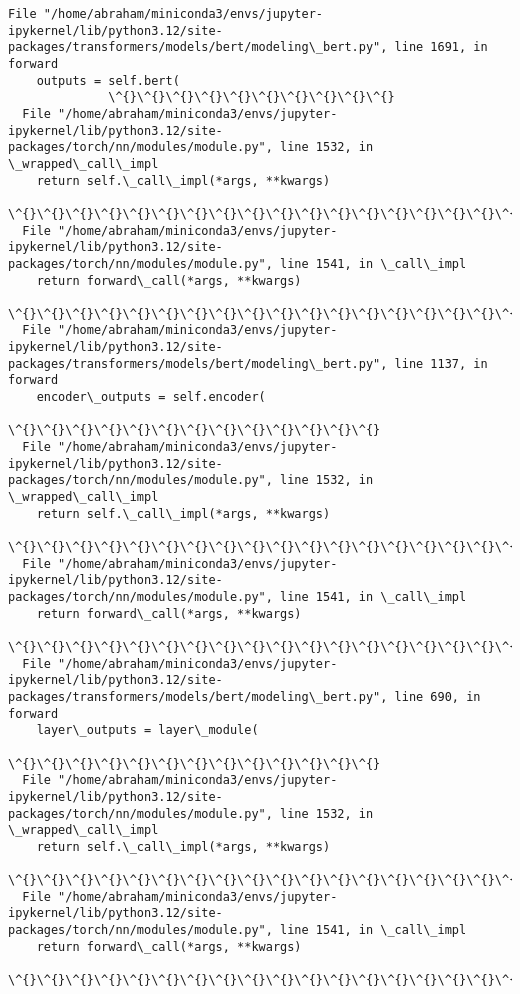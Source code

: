 \documentclass[11pt]{article}
\begin{document}
\begin{Verbatim}[commandchars=\\\{\}]
  File "/home/abraham/miniconda3/envs/jupyter-ipykernel/lib/python3.12/site-
packages/transformers/models/bert/modeling\_bert.py", line 1691, in forward
    outputs = self.bert(
              \^{}\^{}\^{}\^{}\^{}\^{}\^{}\^{}\^{}\^{}
  File "/home/abraham/miniconda3/envs/jupyter-ipykernel/lib/python3.12/site-
packages/torch/nn/modules/module.py", line 1532, in \_wrapped\_call\_impl
    return self.\_call\_impl(*args, **kwargs)
           \^{}\^{}\^{}\^{}\^{}\^{}\^{}\^{}\^{}\^{}\^{}\^{}\^{}\^{}\^{}\^{}\^{}\^{}\^{}\^{}\^{}\^{}\^{}\^{}\^{}\^{}\^{}\^{}\^{}\^{}\^{}\^{}
  File "/home/abraham/miniconda3/envs/jupyter-ipykernel/lib/python3.12/site-
packages/torch/nn/modules/module.py", line 1541, in \_call\_impl
    return forward\_call(*args, **kwargs)
           \^{}\^{}\^{}\^{}\^{}\^{}\^{}\^{}\^{}\^{}\^{}\^{}\^{}\^{}\^{}\^{}\^{}\^{}\^{}\^{}\^{}\^{}\^{}\^{}\^{}\^{}\^{}\^{}\^{}
  File "/home/abraham/miniconda3/envs/jupyter-ipykernel/lib/python3.12/site-
packages/transformers/models/bert/modeling\_bert.py", line 1137, in forward
    encoder\_outputs = self.encoder(
                      \^{}\^{}\^{}\^{}\^{}\^{}\^{}\^{}\^{}\^{}\^{}\^{}\^{}
  File "/home/abraham/miniconda3/envs/jupyter-ipykernel/lib/python3.12/site-
packages/torch/nn/modules/module.py", line 1532, in \_wrapped\_call\_impl
    return self.\_call\_impl(*args, **kwargs)
           \^{}\^{}\^{}\^{}\^{}\^{}\^{}\^{}\^{}\^{}\^{}\^{}\^{}\^{}\^{}\^{}\^{}\^{}\^{}\^{}\^{}\^{}\^{}\^{}\^{}\^{}\^{}\^{}\^{}\^{}\^{}\^{}
  File "/home/abraham/miniconda3/envs/jupyter-ipykernel/lib/python3.12/site-
packages/torch/nn/modules/module.py", line 1541, in \_call\_impl
    return forward\_call(*args, **kwargs)
           \^{}\^{}\^{}\^{}\^{}\^{}\^{}\^{}\^{}\^{}\^{}\^{}\^{}\^{}\^{}\^{}\^{}\^{}\^{}\^{}\^{}\^{}\^{}\^{}\^{}\^{}\^{}\^{}\^{}
  File "/home/abraham/miniconda3/envs/jupyter-ipykernel/lib/python3.12/site-
packages/transformers/models/bert/modeling\_bert.py", line 690, in forward
    layer\_outputs = layer\_module(
                    \^{}\^{}\^{}\^{}\^{}\^{}\^{}\^{}\^{}\^{}\^{}\^{}\^{}
  File "/home/abraham/miniconda3/envs/jupyter-ipykernel/lib/python3.12/site-
packages/torch/nn/modules/module.py", line 1532, in \_wrapped\_call\_impl
    return self.\_call\_impl(*args, **kwargs)
           \^{}\^{}\^{}\^{}\^{}\^{}\^{}\^{}\^{}\^{}\^{}\^{}\^{}\^{}\^{}\^{}\^{}\^{}\^{}\^{}\^{}\^{}\^{}\^{}\^{}\^{}\^{}\^{}\^{}\^{}\^{}\^{}
  File "/home/abraham/miniconda3/envs/jupyter-ipykernel/lib/python3.12/site-
packages/torch/nn/modules/module.py", line 1541, in \_call\_impl
    return forward\_call(*args, **kwargs)
           \^{}\^{}\^{}\^{}\^{}\^{}\^{}\^{}\^{}\^{}\^{}\^{}\^{}\^{}\^{}\^{}\^{}\^{}\^{}\^{}\^{}\^{}\^{}\^{}\^{}\^{}\^{}\^{}\^{}

\end{Verbatim}
\end{document}
